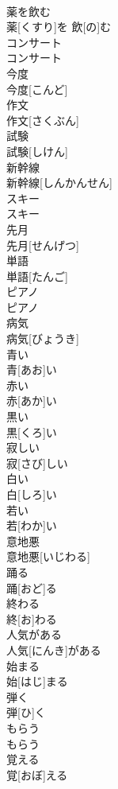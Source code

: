 \documentclass[8pt]{extreport}
\begin{document}
\begin{CJK}{UTF8}{min}
\\	薬を飲む	
\\	薬[くすり]を 飲[の]む
\\	コンサート	
\\	コンサート
\\	今度	
\\	今度[こんど]
\\	作文	
\\	作文[さくぶん]
\\	試験	
\\	試験[しけん]
\\	新幹線	
\\	新幹線[しんかんせん]
\\	スキー	
\\	スキー
\\	先月	
\\	先月[せんげつ]
\\	単語	
\\	単語[たんご]
\\	ピアノ	
\\	ピアノ
\\	病気	
\\	病気[びょうき]
\\	青い	
\\	青[あお]い
\\	赤い	
\\	赤[あか]い
\\	黒い	
\\	黒[くろ]い
\\	寂しい	
\\	寂[さび]しい
\\	白い	
\\	白[しろ]い
\\	若い	
\\	若[わか]い
\\	意地悪	
\\	意地悪[いじわる]
\\	踊る	
\\	踊[おど]る
\\	終わる	
\\	終[お]わる
\\	人気がある	
\\	人気[にんき]がある
\\	始まる	
\\	始[はじ]まる
\\	弾く	
\\	弾[ひ]く
\\	もらう	
\\	もらう
\\	覚える	
\\	覚[おぼ]える

\end{CJK}
\end{document}
